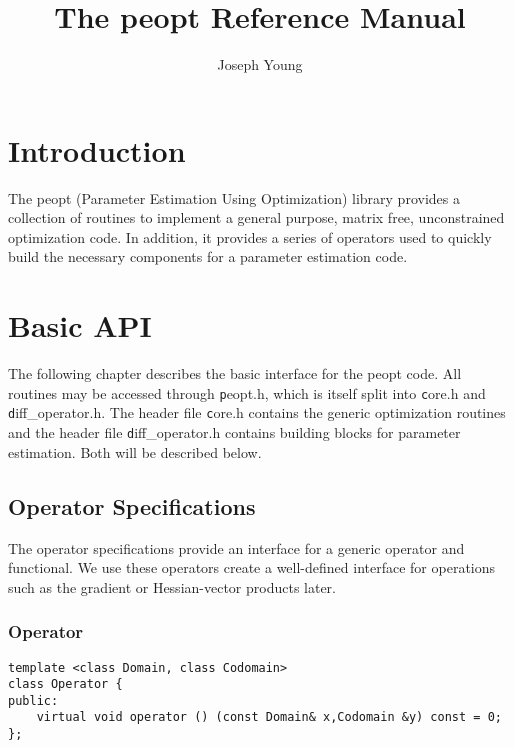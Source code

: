 \documentclass{article}
\title{The peopt Reference Manual}
\author{Joseph Young}
\begin{document}
\lstset{language=C++}


\maketitle

\section{Introduction}

	The peopt (Parameter Estimation Using Optimization) library provides a collection of routines to implement a general purpose, matrix free, unconstrained optimization code.  In addition, it provides a series of operators used to quickly build the necessary components for a parameter estimation code.

\section{Basic API}

	The following chapter describes the basic interface for the peopt code.  All routines may be accessed through {\texttt peopt.h}, which is itself split into {\texttt core.h} and {\texttt diff\_operator.h}.  The header file {\texttt core.h} contains the generic optimization routines and the header file {\texttt diff\_operator.h} contains building blocks for parameter estimation.  Both will be described below.

\subsection{Operator Specifications}

	The operator specifications provide an interface for a generic operator and functional.  We use these operators create a well-defined interface for operations such as the gradient or Hessian-vector products later.

\subsubsection{Operator}

\begin{flushleft}
\begin{lstlisting}
template <class Domain, class Codomain>
class Operator {
public:
    virtual void operator () (const Domain& x,Codomain &y) const = 0;
};
\end{lstlisting}
\end{flushleft}
\end{document}
